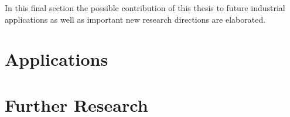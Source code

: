 In this final section the possible contribution of this thesis to future industrial applications as well as important new research directions are elaborated.

\section{Applications}


\section{Further Research}
